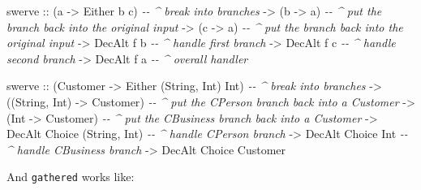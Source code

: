 \documentclass[]{article}
\newenvironment{Shaded}{}{}
\newcommand{\CommentTok}[1]{\textcolor[rgb]{0.38,0.63,0.69}{\textit{#1}}}
\newcommand{\DataTypeTok}[1]{\textcolor[rgb]{0.56,0.13,0.00}{#1}}
\newcommand{\NormalTok}[1]{#1}
\newcommand{\OtherTok}[1]{\textcolor[rgb]{0.00,0.44,0.13}{#1}}
\begin{document}
\begin{Shaded}
\begin{Highlighting}[]
\NormalTok{swerve}
\OtherTok{    ::}\NormalTok{ (a }\OtherTok{{-}>} \DataTypeTok{Either}\NormalTok{ b c)    }\CommentTok{{-}{-} \^{} break into branches}
    \OtherTok{{-}>}\NormalTok{ (b }\OtherTok{{-}>}\NormalTok{ a)             }\CommentTok{{-}{-} \^{} put the branch back into the original input}
    \OtherTok{{-}>}\NormalTok{ (c }\OtherTok{{-}>}\NormalTok{ a)             }\CommentTok{{-}{-} \^{} put the branch back into the original input}
    \OtherTok{{-}>} \DataTypeTok{DecAlt}\NormalTok{ f b           }\CommentTok{{-}{-} \^{} handle first branch}
    \OtherTok{{-}>} \DataTypeTok{DecAlt}\NormalTok{ f c           }\CommentTok{{-}{-} \^{} handle second branch}
    \OtherTok{{-}>} \DataTypeTok{DecAlt}\NormalTok{ f a           }\CommentTok{{-}{-} \^{} overall handler}

\NormalTok{swerve}
\OtherTok{    ::}\NormalTok{ (}\DataTypeTok{Customer} \OtherTok{{-}>} \DataTypeTok{Either}\NormalTok{ (}\DataTypeTok{String}\NormalTok{, }\DataTypeTok{Int}\NormalTok{) }\DataTypeTok{Int}\NormalTok{)   }\CommentTok{{-}{-} \^{} break into branches}
    \OtherTok{{-}>}\NormalTok{ ((}\DataTypeTok{String}\NormalTok{, }\DataTypeTok{Int}\NormalTok{) }\OtherTok{{-}>} \DataTypeTok{Customer}\NormalTok{)              }\CommentTok{{-}{-} \^{} put the CPerson branch back into a Customer}
    \OtherTok{{-}>}\NormalTok{ (}\DataTypeTok{Int} \OtherTok{{-}>} \DataTypeTok{Customer}\NormalTok{)                        }\CommentTok{{-}{-} \^{} put the CBusiness branch back into a Customer}
    \OtherTok{{-}>} \DataTypeTok{DecAlt} \DataTypeTok{Choice}\NormalTok{ (}\DataTypeTok{String}\NormalTok{, }\DataTypeTok{Int}\NormalTok{)              }\CommentTok{{-}{-} \^{} handle CPerson branch}
    \OtherTok{{-}>} \DataTypeTok{DecAlt} \DataTypeTok{Choice} \DataTypeTok{Int}                        \CommentTok{{-}{-} \^{} handle CBusiness branch}
    \OtherTok{{-}>} \DataTypeTok{DecAlt} \DataTypeTok{Choice} \DataTypeTok{Customer}
\end{Highlighting}
\end{Shaded}

And \texttt{gathered} works like:
\end{document}

